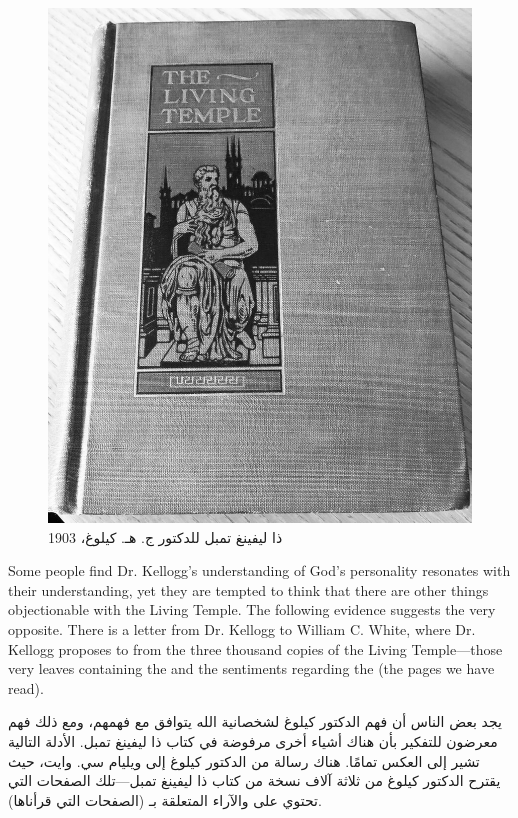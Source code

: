 \begin{figure}[hp]
    \centering
    \includegraphics[width=1\linewidth]{images/TLT.jpg}
    \caption*{ذا ليفينغ تمبل للدكتور ج. هـ. كيلوغ، 1903}
    \label{fig:tlt}
\end{figure}


Some people find Dr. Kellogg’s understanding of God’s personality resonates with their understanding, yet they are tempted to think that there are other things objectionable with the Living Temple. The following evidence suggests the very opposite. There is a letter from Dr. Kellogg to William C. White, where Dr. Kellogg proposes to  from the three thousand copies of the Living Temple—those very leaves containing the  and the sentiments regarding the  (the pages we have read).


يجد بعض الناس أن فهم الدكتور كيلوغ لشخصانية الله يتوافق مع فهمهم، ومع ذلك فهم معرضون للتفكير بأن هناك أشياء أخرى مرفوضة في كتاب ذا ليفينغ تمبل. الأدلة التالية تشير إلى العكس تمامًا. هناك رسالة من الدكتور كيلوغ إلى ويليام سي. وايت، حيث يقترح الدكتور كيلوغ  من ثلاثة آلاف نسخة من كتاب ذا ليفينغ تمبل—تلك الصفحات التي تحتوي على  والآراء المتعلقة بـ (الصفحات التي قرأناها).


